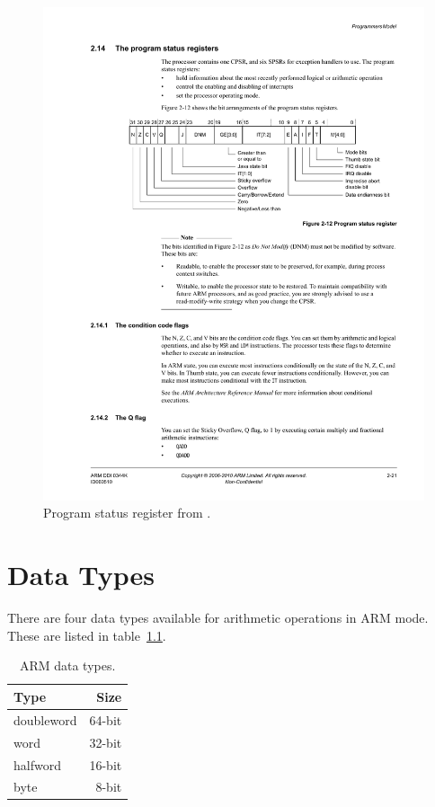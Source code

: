 \documentclass[oneside,a4paper]{report}
\begin{document}
\begin{figure}[htb]
	\centering
	\includegraphics{./fig/CPSR.pdf}
	\caption{Program status register from \cite[p. 2-21]{A8Ref}.}
	\label{fig:cpsr}
\end{figure}


\chapter{Data Types}

There are four data types available for arithmetic operations in ARM mode. These are listed in table~\ref{tbl:datatypes}.

\begin{table}[htb]
	\centering
	\begin{tabular}{lr}
		\toprule
		Type			&		Size		\\
		\midrule
		doubleword		&		64-bit		\\
		word			& 		32-bit		\\
		halfword 		& 		16-bit		\\
		byte 			& 		8-bit		\\
		\bottomrule
	\end{tabular}
	\caption{ARM data types.}
	\label{tbl:datatypes}
\end{table}
\end{document}
